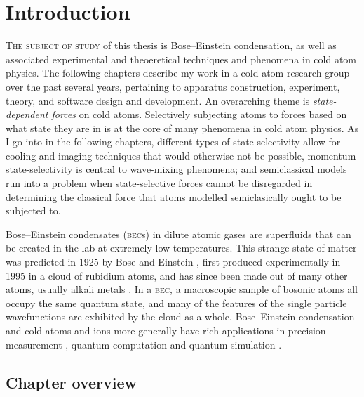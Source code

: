 \chapter{Introduction}\label{chap:introduction}

\lettrine[lines=3]{T}{he subject of study} of this thesis is Bose--Einstein condensation, as well as associated experimental and theoeretical techniques and phenomena in cold atom physics. The following chapters describe my work in a cold atom research group over the past several years, pertaining to apparatus construction, experiment, theory, and software design and development. An overarching theme is \emph{state-dependent forces} on cold atoms. Selectively subjecting atoms to forces based on what state they are in is at the core of many phenomena in cold atom physics. As I go into in the following chapters, different types of state selectivity allow for cooling and imaging techniques that would otherwise not be possible, momentum state-selectivity is central to wave-mixing phenomena; and semiclassical models run into a problem when state-selective forces cannot be disregarded in determining the classical force that atoms modelled semiclasically ought to be subjected to.

Bose--Einstein condensates (\textsc{bec}s) in dilute atomic gases are superfluids that can be created in the lab at extremely low temperatures. This strange state of matter was predicted in 1925 by Bose and Einstein \cite{bose_plancks_1924, einstein_quantentheorie_1925} , first produced experimentally in 1995 \cite{anderson_observation_1995} in a cloud of rubidium atoms, and has since been made out of many other atoms, usually alkali metals \cite{davis_bose-einstein_1995, modugno_bose-einstein_2001, bradley_bose-einstein_1997, weber_bose-einstein_2003}. In a \textsc{bec}, a macroscopic sample of bosonic atoms all occupy the same quantum state, and many of the features of the single particle wavefunctions are exhibited by the cloud as a whole. Bose--Einstein condensation and cold atoms and ions more generally have rich applications in precision measurement \cite{robins_atom_2013, cronin_optics_2009}, quantum computation \cite{ladd_quantum_2010, negretti_quantum_2011} and quantum simulation \cite{bloch_quantum_2012, blatt_quantum_2012}.  

\section{Chapter overview}

